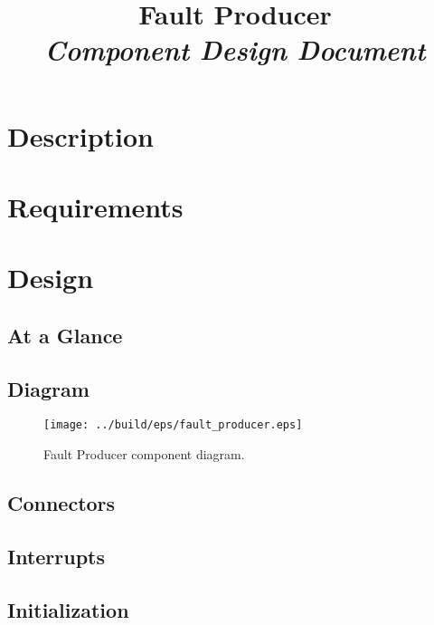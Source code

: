 



\title{\textbf{Fault Producer} \\
\large\textit{Component Design Document}}
\date{}
\maketitle

\section{Description}


\section{Requirements}


\section{Design}

\subsection{At a Glance}


\subsection{Diagram}
\begin{figure}[H]
  \texttt{[image: ../build/eps/fault\_producer.eps]}
  \caption{Fault Producer component diagram.}
\end{figure}

\subsection{Connectors}


\subsection{Interrupts}



\subsection{Initialization}


